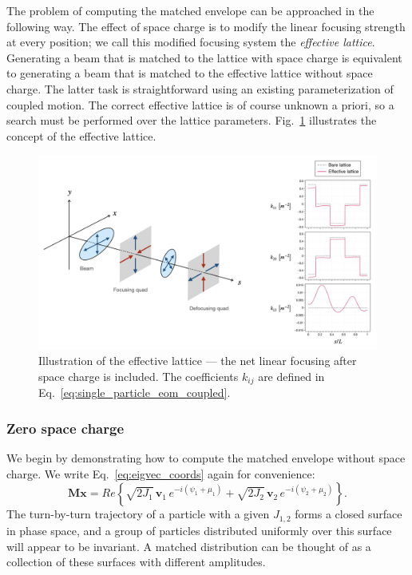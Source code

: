 The problem of computing the matched envelope can be approached in the following way. The effect of space charge is to modify the linear focusing strength at every position; we call this modified focusing system the \textit{effective lattice}. Generating a beam that is matched to the lattice with space charge is equivalent to generating a beam that is matched to the effective lattice without space charge. The latter task is straightforward using an existing parameterization of coupled motion. The correct effective lattice is of course unknown a priori, so a search must be performed over the lattice parameters. Fig.~\ref{fig:effective_lattice} illustrates the concept of the effective lattice.
%
\begin{figure}
    \centering
    \includegraphics[width=1.0\textwidth]{Images/chapter2/effective_lattice.png}
    \caption{Illustration of the effective lattice — the net linear focusing after space charge is included. The coefficients $k_{ij}$ are defined in Eq.~\eqref{eq:single_particle_eom_coupled}.}
    \label{fig:effective_lattice}
\end{figure}
%

\subsubsection{Zero space charge}

We begin by demonstrating how to compute the matched envelope without space charge. We write Eq.~\eqref{eq:eigvec_coords} again for convenience:
%
\begin{equation}
    \mathbf{Mx} = Re \left\{
        \sqrt{2 J_1} \, \mathbf{v}_1 \, e^{-i(\psi_1 + \mu_1)}
        + \sqrt{2 J_2} \, \mathbf{v}_2 \, e^{-i(\psi_2 + \mu_2)}
    \right\}.
\end{equation}
%
The turn-by-turn trajectory of a particle with a given $J_{1,2}$ forms a closed surface in phase space, and a group of particles distributed uniformly over this surface will appear to be invariant. A matched distribution can be thought of as a collection of these surfaces with different amplitudes.

